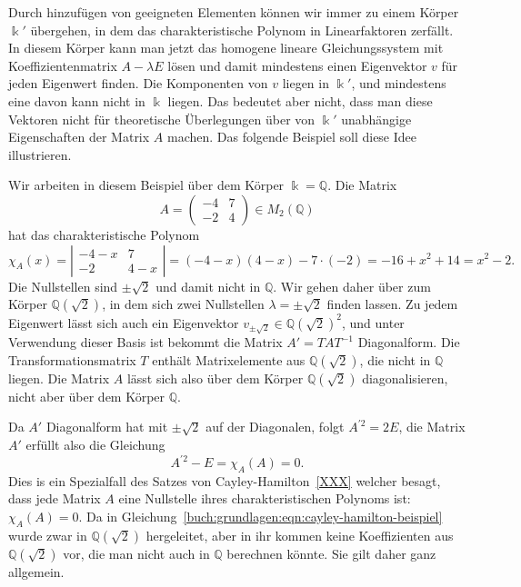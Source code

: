 Durch hinzufügen von geeigneten Elementen können wir immer zu einem 
Körper $\Bbbk'$ übergehen, in dem das charakteristische Polynom
in Linearfaktoren zerfällt.
In diesem Körper kann man jetzt das homogene lineare Gleichungssystem
mit Koeffizientenmatrix $A-\lambda E$ lösen und damit mindestens 
einen Eigenvektor $v$ für jeden Eigenwert finden.
Die Komponenten von $v$ liegen in $\Bbbk'$, und mindestens eine davon kann
nicht in $\Bbbk$ liegen.
Das bedeutet aber nicht, dass man diese Vektoren nicht für theoretische
Überlegungen über von $\Bbbk'$ unabhängige Eigenschaften der Matrix $A$ machen.
Das folgende Beispiel soll diese Idee illustrieren.

\begin{beispiel}
Wir arbeiten in diesem Beispiel über dem Körper $\Bbbk=\mathbb{Q}$.
Die Matrix
\[
A=\begin{pmatrix}
-4&7\\
-2&4
\end{pmatrix}
\in
M_2(\mathbb{Q})
\]
hat das charakteristische Polynom
\[
\chi_A(x)
=
\left|
\begin{matrix}
-4-x&7\\-2&4-x
\end{matrix}
\right|
=
(-4-x)(4-x)-7\cdot(-2)
=
-16+x^2+14
=
x^2-2.
\]
Die Nullstellen sind $\pm\sqrt{2}$ und damit nicht in $\mathbb{Q}$.
Wir gehen daher über zum Körper $\mathbb{Q}(\sqrt{2})$, in dem 
sich zwei Nullstellen $\lambda=\pm\sqrt{2}$ finden lassen.
Zu jedem Eigenwert lässt sich auch ein Eigenvektor
$v_{\pm\sqrt{2}}\in \mathbb{Q}(\sqrt{2})^2$, und unter Verwendung dieser
Basis ist bekommt die Matrix $A'=TAT^{-1}$ Diagonalform.
Die Transformationsmatrix $T$ enthält Matrixelemente aus
$\mathbb{Q}(\sqrt{2})$, die nicht in $\mathbb{Q}$ liegen.
Die Matrix $A$ lässt sich also über dem Körper $\mathbb{Q}(\sqrt{2})$
diagonalisieren, nicht aber über dem Körper $\mathbb{Q}$.

Da $A'$ Diagonalform hat mit $\pm\sqrt{2}$ auf der Diagonalen, folgt
$A^{\prime 2} = 2E$, die Matrix $A'$ erfüllt also die Gleichung
\begin{equation}
A^{\prime 2}-E= \chi_{A}(A) = 0.
\label{buch:grundlagen:eqn:cayley-hamilton-beispiel}
\end{equation}
Dies is ein Spezialfall des Satzes von Cayley-Hamilton~\ref{XXX}
welcher besagt, dass jede Matrix $A$ eine Nullstelle ihres 
charakteristischen Polynoms ist: $\chi_A(A)=0$.
Da in Gleichung~\ref{buch:grundlagen:eqn:cayley-hamilton-beispiel}
wurde zwar in $\mathbb{Q}(\sqrt{2})$ hergeleitet, aber in ihr kommen
keine Koeffizienten aus $\mathbb{Q}(\sqrt{2})$ vor, die man nicht auch
in $\mathbb{Q}$ berechnen könnte.
Sie gilt daher ganz allgemein.
\end{beispiel}

